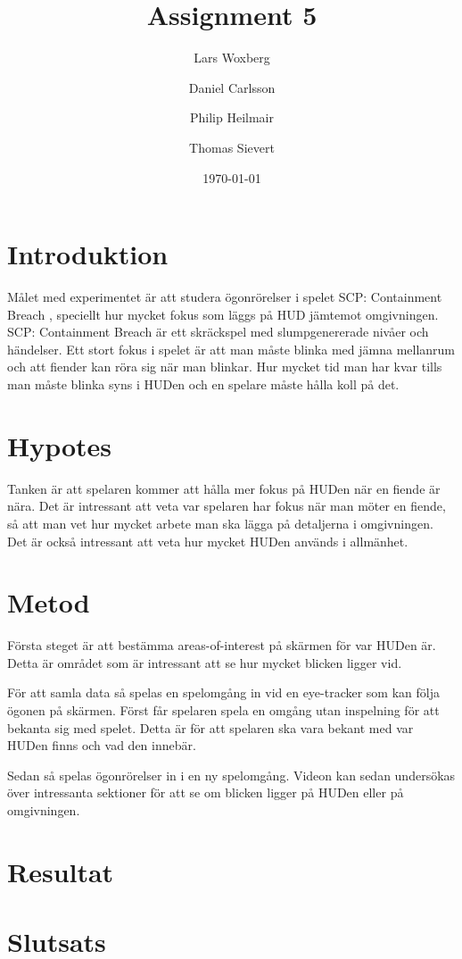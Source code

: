 \documentclass{article}
\author{Lars Woxberg \and Daniel Carlsson \and Philip Heilmair \and Thomas Sievert}
\date{\today}
\title{Assignment 5}
\begin{document}
\maketitle


\section{Introduktion}
Målet med experimentet är att studera ögonrörelser i spelet SCP: Containment Breach \cite{SCP}, speciellt hur mycket fokus som läggs på HUD jämtemot omgivningen. SCP: Containment Breach är ett skräckspel med slumpgenererade nivåer och händelser. Ett stort fokus i spelet är att man måste blinka med jämna mellanrum och att fiender kan röra sig när man blinkar. Hur mycket tid man har kvar tills man måste blinka syns i HUDen och en spelare måste hålla koll på det.

\section{Hypotes}
Tanken är att spelaren kommer att hålla mer fokus på HUDen när en fiende är nära. Det är intressant att veta var spelaren har fokus när man möter en fiende, så att man vet hur mycket arbete man ska lägga på detaljerna i omgivningen. Det är också intressant att veta hur mycket HUDen används i allmänhet.

\section{Metod}
Första steget är att bestämma areas-of-interest på skärmen för var HUDen är. Detta är området som är intressant att se hur mycket blicken ligger vid.

För att samla data så spelas en spelomgång in vid en eye-tracker som kan följa ögonen på skärmen. Först får spelaren spela en omgång utan inspelning för att bekanta sig med spelet. Detta är för att spelaren ska vara bekant med var HUDen finns och vad den innebär. 

Sedan så spelas ögonrörelser in i en ny spelomgång. Videon kan sedan undersökas över intressanta sektioner för att se om blicken ligger på HUDen eller på omgivningen.

\section{Resultat}

\section{Slutsats}



\end{document}
